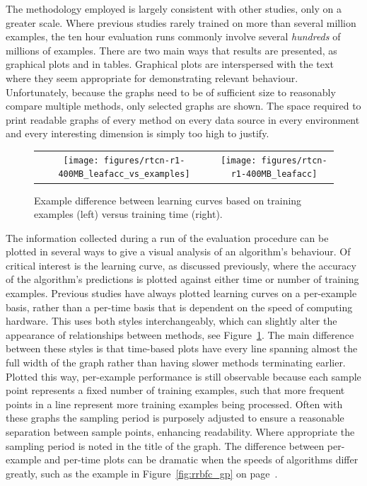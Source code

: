 The methodology employed is largely consistent with other studies, only on a greater scale. Where previous studies rarely trained on more than several million examples, the ten hour evaluation runs commonly involve several {\em hundreds} of millions of examples. There are two main ways that results are presented, as graphical plots and in tables. Graphical plots are interspersed with the text where they seem appropriate for demonstrating relevant behaviour. Unfortunately, because the graphs need to be of sufficient size to reasonably compare multiple methods, only selected graphs are shown. The space required to print readable graphs of every method on every data source in every environment and every interesting dimension is simply too high to justify.

\begin{figure}
\centering
\begin{tabular}{c@{}c}
\texttt{[image: figures/rtcn-r1-400MB\_leafacc\_vs\_examples]} &
\texttt{[image: figures/rtcn-r1-400MB\_leafacc]} \\
\end{tabular}
\caption{Example difference between learning curves based on training examples (left) versus training time (right).}
\label{fig:examples_vs_time}
\end{figure}

The information collected during a run of the evaluation procedure can be plotted in several ways to give a visual analysis of an algorithm's behaviour. Of critical interest is the learning curve, as discussed previously, where the accuracy of the algorithm's predictions is plotted against either time or number of training examples.
Previous studies have always plotted learning curves on a per-example basis, rather than a per-time basis that is dependent on the speed of computing hardware. This \thesis uses both styles interchangeably, which can slightly alter the appearance of relationships between methods, see Figure~\ref{fig:examples_vs_time}. The main difference between these styles is that time-based plots have every line spanning almost the full width of the graph rather than having slower methods terminating earlier. Plotted this way, per-example performance is still observable because each sample point represents a fixed number of training examples, such that more frequent points in a line represent more training examples being processed. Often with these graphs the sampling period is purposely adjusted to ensure a reasonable separation between sample points, enhancing readability. Where appropriate the sampling period is noted in the title of the graph. The difference between per-example and per-time plots can be dramatic when the speeds of algorithms differ greatly, such as the example in Figure~\ref{fig:rrbfc_gp} on page~\pageref{fig:rrbfc_gp}.


